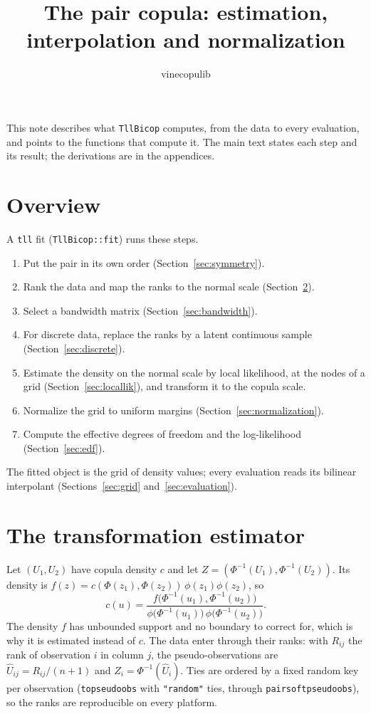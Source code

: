 \documentclass[11pt]{article}
\title{The \code{tll} pair copula: estimation, interpolation and normalization}
\author{vinecopulib}
\date{}
\newcommand{\codeus}{\textunderscore\allowbreak}
\newcommand{\code}[1]{\begingroup\let\_\codeus\texttt{#1}\endgroup}
\begin{document}
\maketitle

\noindent
This note describes what \code{TllBicop} computes, from the data to every
evaluation, and points to the functions that compute it. The main text states
each step and its result; the derivations are in the appendices.

\tableofcontents

\section{Overview}

A \code{tll} fit (\code{TllBicop::fit}) runs these steps.
\begin{enumerate}
  \item Put the pair in its own order (Section~\ref{sec:symmetry}).
  \item Rank the data and map the ranks to the normal scale
    (Section~\ref{sec:transformation}).
  \item Select a bandwidth matrix (Section~\ref{sec:bandwidth}).
  \item For discrete data, replace the ranks by a latent continuous sample
    (Section~\ref{sec:discrete}).
  \item Estimate the density on the normal scale by local likelihood, at the
    nodes of a grid (Section~\ref{sec:locallik}), and transform it to the
    copula scale.
  \item Normalize the grid to uniform margins (Section~\ref{sec:normalization}).
  \item Compute the effective degrees of freedom and the log-likelihood
    (Section~\ref{sec:edf}).
\end{enumerate}
The fitted object is the grid of density values; every evaluation reads its
bilinear interpolant (Sections~\ref{sec:grid} and~\ref{sec:evaluation}).

\section{The transformation estimator}
\label{sec:transformation}

Let $(U_1, U_2)$ have copula density $c$ and let $Z = (\Phi^{-1}(U_1),
\Phi^{-1}(U_2))$. Its density is $f(z) = c(\Phi(z_1), \Phi(z_2))\,
\phi(z_1)\phi(z_2)$, so
\begin{equation}
  c(u) = \frac{f\bigl(\Phi^{-1}(u_1), \Phi^{-1}(u_2)\bigr)}
              {\phi\bigl(\Phi^{-1}(u_1)\bigr)\,\phi\bigl(\Phi^{-1}(u_2)\bigr)}.
  \label{eq:transformation}
\end{equation}
The density $f$ has unbounded support and no boundary to correct for, which is
why it is estimated instead of $c$. The data enter through their ranks: with
$R_{ij}$ the rank of observation $i$ in column $j$, the pseudo-observations are
$\widehat U_{ij} = R_{ij} / (n + 1)$ and $Z_i = \Phi^{-1}(\widehat U_i)$.
Ties are ordered by a fixed random key per observation (\code{to\_pseudo\_obs}
with \code{"random"} ties, through \code{pair\_soft\_pseudo\_obs}), so the
ranks are reproducible on every platform.
\end{document}
